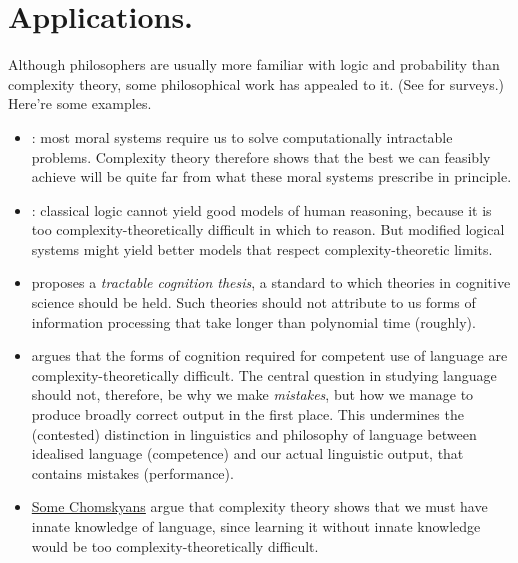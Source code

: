\section*{Applications.}
Although philosophers are usually more familiar with logic and probability than complexity theory, some philosophical work has appealed to it. (See \textcites{aaronson2013}{szymanik2018}{vanrooij2019}{dean2021} for surveys.) Here’re some examples.
\begin{itemize}
    \item \textcite{stenseke2024}: most moral systems require us to solve computationally intractable problems. Complexity theory therefore shows that the best we can feasibly achieve will be quite far from what these moral systems prescribe in principle.
    \item \textcite{levesque1988}: classical logic cannot yield good models of human reasoning, because it is too complexity-theoretically difficult in which to reason. But modified logical systems might yield better models that respect complexity-theoretic limits.
    \item \textcite{vanrooij2008} proposes a \emph{tractable cognition thesis}, a standard to which theories in cognitive science should be held. Such theories should not attribute to us forms of information processing that take longer than polynomial time (roughly).
    \item \textcite[§ 6.3]{ristad1993} argues that the forms of cognition required for competent use of language are complexity-theoretically difficult. The central question in studying language should not, therefore, be why we make \emph{mistakes}, but how we manage to produce broadly correct output in the first place. This undermines the (contested) distinction in linguistics and philosophy of language between idealised language (competence) and our actual linguistic output, that contains mistakes (performance). 
    \item \href{https://vignetterie.org/vignettes/thesis-proposal.html}{Some Chomskyans} argue that complexity theory shows that we must have innate knowledge of language, since learning it without innate knowledge would be too complexity-theoretically difficult.
\end{itemize}

